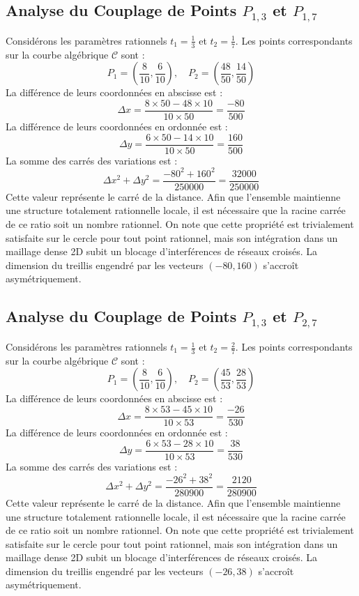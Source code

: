 \documentclass[12pt, a4paper]{article}
\begin{document}
\subsection{Analyse du Couplage de Points $P_{1,3}$ et $P_{1,7}$}
Considérons les paramètres rationnels $t_1 = \frac{1}{3}$ et $t_2 = \frac{1}{7}$.
Les points correspondants sur la courbe algébrique $\mathcal{C}$ sont :
$$ P_1 = \left( \frac{8}{10}, \frac{6}{10} \right), \quad P_2 = \left( \frac{48}{50}, \frac{14}{50} \right) $$
La différence de leurs coordonnées en abscisse est :
$$ \Delta x = \frac{8 \times 50 - 48 \times 10}{10 \times 50} = \frac{-80}{500} $$
La différence de leurs coordonnées en ordonnée est :
$$ \Delta y = \frac{6 \times 50 - 14 \times 10}{10 \times 50} = \frac{160}{500} $$
La somme des carrés des variations est :
$$ \Delta x^2 + \Delta y^2 = \frac{ -80^2 + 160^2 }{ 250000 } = \frac{ 32000 }{ 250000 } $$
Cette valeur représente le carré de la distance. Afin que l'ensemble maintienne une structure totalement rationnelle locale, il est nécessaire que la racine carrée de ce ratio soit un nombre rationnel. On note que cette propriété est trivialement satisfaite sur le cercle pour tout point rationnel, mais son intégration dans un maillage dense 2D subit un blocage d'interférences de réseaux croisés. La dimension du treillis engendré par les vecteurs $( -80, 160 )$ s'accroît asymétriquement.


\subsection{Analyse du Couplage de Points $P_{1,3}$ et $P_{2,7}$}
Considérons les paramètres rationnels $t_1 = \frac{1}{3}$ et $t_2 = \frac{2}{7}$.
Les points correspondants sur la courbe algébrique $\mathcal{C}$ sont :
$$ P_1 = \left( \frac{8}{10}, \frac{6}{10} \right), \quad P_2 = \left( \frac{45}{53}, \frac{28}{53} \right) $$
La différence de leurs coordonnées en abscisse est :
$$ \Delta x = \frac{8 \times 53 - 45 \times 10}{10 \times 53} = \frac{-26}{530} $$
La différence de leurs coordonnées en ordonnée est :
$$ \Delta y = \frac{6 \times 53 - 28 \times 10}{10 \times 53} = \frac{38}{530} $$
La somme des carrés des variations est :
$$ \Delta x^2 + \Delta y^2 = \frac{ -26^2 + 38^2 }{ 280900 } = \frac{ 2120 }{ 280900 } $$
Cette valeur représente le carré de la distance. Afin que l'ensemble maintienne une structure totalement rationnelle locale, il est nécessaire que la racine carrée de ce ratio soit un nombre rationnel. On note que cette propriété est trivialement satisfaite sur le cercle pour tout point rationnel, mais son intégration dans un maillage dense 2D subit un blocage d'interférences de réseaux croisés. La dimension du treillis engendré par les vecteurs $( -26, 38 )$ s'accroît asymétriquement.
\end{document}
